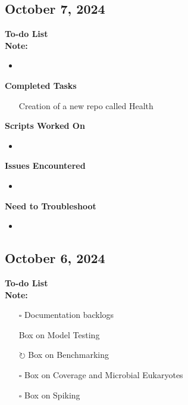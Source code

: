 \documentclass[11pt]{report}
\newcommand{\done}{\checkmark}
\newcommand{\pending}{$\square$}
\newcommand{\refine}{$\circlearrowright$}
\begin{document}
{\begin{multicols}{2}
	\section{October 7, 2024}
	
	
	\textbf{To-do List} \\
	\textbf{Note:} 
	
	\begin{itemize}
		\item 
	\end{itemize}
	
	\textbf{Completed Tasks}
	\begin{itemize}
		\item [\done] Creation of a new repo called Health
		
	\end{itemize}
	
	\textbf{Scripts Worked On}
	\begin{itemize}
		\item
	\end{itemize}
	
	
	\textbf{Issues Encountered}
	\begin{itemize}
		\item 
	\end{itemize}
	
	\textbf{Need to Troubleshoot}
	\begin{itemize}
		\item 
	\end{itemize}
\end{multicols}

\newpage

\begin{multicols}{2}
	\section{October 6, 2024}
	
	
	\textbf{To-do List} \\
	\textbf{Note:} 
	
	\begin{itemize}
		\item [\pending] Documentation backlogs
		\item [\done] Box on Model Testing
		\item [\refine] Box on Benchmarking
		\item [\pending] Box on Coverage and Microbial Eukaryotes
		\item [\pending] Box on Spiking 
	\end{itemize}
	

\end{multicols}}
\end{document}
